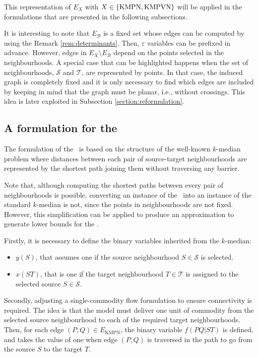 \documentclass[a4paper,  review, authoryear, 1p.]{elsarticle}
\newcommand{\KMPN}{{\sf{H-KMPN}}}
\newcommand{\EB}{{E^{}_{\mathcal B}}}
\newcommand{\EKMPN}{{E_{\text{KMPN}}}}
\begin{document}
This representation of $E_X$ with $X\in \{\rm KMPN, \rm KMPVN\}$ will be applied in the formulations that are presented in the following subsections. 

It is interesting to note that $\EB$ is a fixed set whose edges can be computed by using the Remark \ref{rem:determinants}. Then, $\varepsilon$ variables can be prefixed in advance. However, edges in $E_X\setminus \EB$ depend on the points selected in the neighbourhoods. A special case that can be highlighted happens when the set of neighbourhoods, $\mathcal S$ and $\mathcal T$, are represented by points. In that case, the induced graph is completely fixed and it is only necessary to find which edges are included by keeping in mind that the graph must be planar, i.e., without crossings. This idea is later exploited in Subsection \ref{section:reformulation}.

\subsection{A formulation for the \KMPN}

The formulation of the \KMPN \ is based on the structure of the well-known $k$-median problem where distances between each pair of source-target neighbourhoods are represented by the shortest path joining them without traversing any barrier.

Note that, although computing the shortest paths between every pair of neighbourhoods is possible, converting an instance of the \KMPN \ into an instance of the standard $k$-median is not, since the points in neighbourhoods are not fixed. However, this simplification can be applied to produce an approximation to generate lower bounds for the \KMPN.

\newcommand{\xvar}[2]{x(#1#2)}

Firstly, it is necessary to define the binary variables inherited from the $k$-median:
\begin{itemize}
	\item $y(S)$, that assumes one if the source neighbourhood $S\in\mathcal S$ is selected.
	\item $x(ST)$, that is one if the target neighbourhood $T\in\mathcal T$ is assigned to the selected source $S\in\mathcal S$.
\end{itemize}
	
Secondly, adjusting a single-commodity flow formulation to ensure connectivity is required. The idea is that the model must deliver one unit of commodity from the selected source neighbourhood to each of the required target neighbourhoods. Then, for each edge $(P, Q)\in \EKMPN$, the binary variable $f(PQ|ST)$ is defined, and takes the value of one when edge $(P, Q)$ is traversed in the path to go from the source $S$ to the target $T$. 
\end{document}
